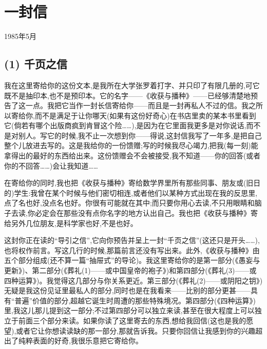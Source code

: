 \chapter{一封信}

\noindent 1985年5月\par

\section{(1) 千页之信}

我在这里寄给你的这份文本,是我所在大学张罗着打字、并只印了有限几册的,可它既不是抽印本,也不是预印本。它的名字——《收获与播种》——已经够清楚地预告了这一点。我把它当作一封长信寄给你——而且是一封再私人不过的信。我之所以寄给你,而不是满足于让你哪天(如果有这份好奇心)在书店里卖的某本书里看到它(倘若有哪个出版商疯到肯冒这个险……),是因为在它里面我更多是对你说话,而不是对别人。写它的时候,我不止一次想到你——得说,这封信我写了一年多,是把自己整个儿放进去写的。这是我给你的一份馈赠;写的时候我尽心竭力,把我(每一刻)能拿得出的最好的东西给出来。这份馈赠会不会被接受,我不知道——你的回答(或者你的不回答……)会让我知道……

在寄给你的同时,我也把《收获与播种》寄给数学界里所有那些同事、朋友或(旧日的)学生:我曾在某个时候与他们密切相连,或者他们以某种方式出现在我的反思里,点了名也好,没点名也好。你很有可能就在其中;而只要你用心去读,不只用眼睛和脑子去读,你必定会在那些没有点你名字的地方认出自己。我也把《收获与播种》寄给另外几位朋友,是科学家也好,不是也好。

这封你正在读的“导引之信”,它向你预告并呈上一封“千页之信”(这还只是开头……),也将权作前言。写这几行的时候,那篇前言还没有写出来。此外,《收获与播种》由五个部分组成(还不算一篇“抽屉式”的导论)。我这里寄给你的是第一部分(《愚妄与更新》)、第二部分(《葬礼(1)——或中国皇帝的袍子》)和第四部分(《葬礼(3)——或四种运算》)。我觉得这几部分与你关系更近。第三部分(《葬礼(2)——或阴阳之钥》)无疑是我这份见证里最私人的部分,同时也是在我看来——比别的部分更甚——具有“普遍”价值的部分,超越它诞生时周遭的那些特殊境况。第四部分(《四种运算》)里,我这儿那儿提到这一部分;不过第四部分可以独立来读,甚至在很大程度上可以独立于前面三个部分来读。如果你读了这里寄去的东西,想给我回信(这也是我的愿望),或者它让你想读读缺的那一部分,那就告诉我。只要你回信让我感到你的兴趣超出了纯粹表面的好奇,我很乐意把它寄给你。

